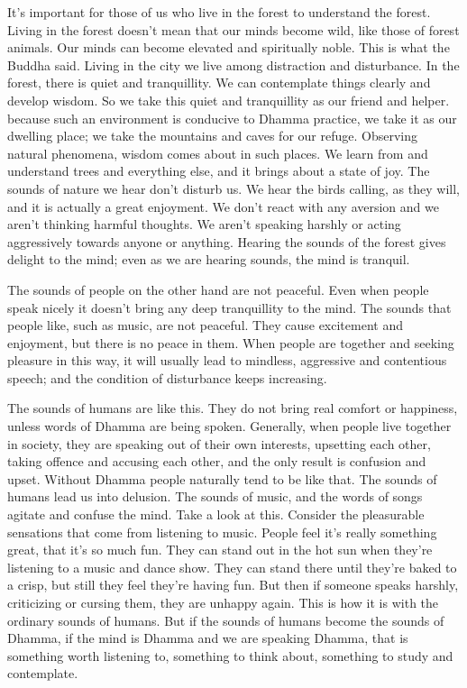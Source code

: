 It's important for those of us who live in the forest to understand the forest. Living in the forest doesn't mean that our minds become wild, like those of forest animals. Our minds can become elevated and spiritually noble. This is what the Buddha said. Living in the city we live among distraction and disturbance. In the forest, there is quiet and tranquillity. We can contemplate things clearly and develop wisdom. So we take this quiet and tranquillity as our friend and helper. because such an environment is conducive to Dhamma practice, we take it as our dwelling place; we take the mountains and caves for our refuge. Observing natural phenomena, wisdom comes about in such places. We learn from and understand trees and everything else, and it brings about a state of joy. The sounds of nature we hear don't disturb us. We hear the birds calling, as they will, and it is actually a great enjoyment. We don't react with any aversion and we aren't thinking harmful thoughts. We aren't speaking harshly or acting aggressively towards anyone or anything. Hearing the sounds of the forest gives delight to the mind; even as we are hearing sounds, the mind is tranquil.

The sounds of people on the other hand are not peaceful. Even when people speak nicely it doesn't bring any deep tranquillity to the mind. The sounds that people like, such as music, are not peaceful. They cause excitement and enjoyment, but there is no peace in them. When people are together and seeking pleasure in this way, it will usually lead to mindless, aggressive and contentious speech; and the condition of disturbance keeps increasing.

The sounds of humans are like this. They do not bring real comfort or happiness, unless words of Dhamma are being spoken. Generally, when people live together in society, they are speaking out of their own interests, upsetting each other, taking offence and accusing each other, and the only result is confusion and upset. Without Dhamma people naturally tend to be like that. The sounds of humans lead us into delusion. The sounds of music, and the words of songs agitate and confuse the mind. Take a look at this. Consider the pleasurable sensations that come from listening to music. People feel it's really something great, that it's so much fun. They can stand out in the hot sun when they're listening to a music and dance show. They can stand there until they're baked to a crisp, but still they feel they're having fun. But then if someone speaks harshly, criticizing or cursing them, they are unhappy again. This is how it is with the ordinary sounds of humans. But if the sounds of humans become the sounds of Dhamma, if the mind is Dhamma and we are speaking Dhamma, that is something worth listening to, something to think about, something to study and contemplate.

